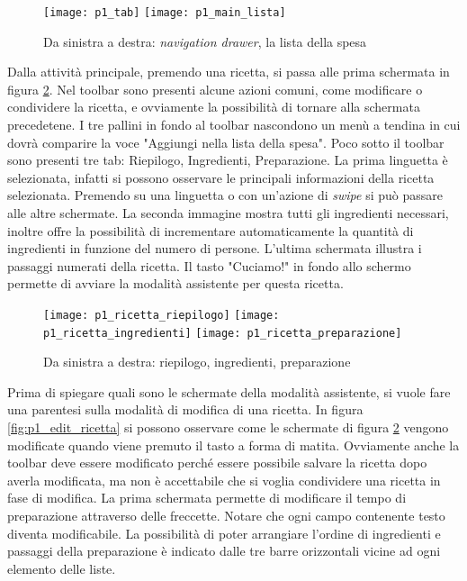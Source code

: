 \begin{figure}[ht]
  \begin{center}
    \texttt{[image: p1\_tab]}
    \texttt{[image: p1\_main\_lista]}
    \caption{Da sinistra a destra: \textit{navigation drawer}, la lista della spesa}
    \label{fig:p1_lista_spesa}
  \end{center}
\end{figure}


\clearpage
Dalla attività principale, premendo una ricetta, si passa alle prima schermata in figura \ref{fig:p1_ricetta}.
Nel toolbar sono presenti alcune azioni comuni, come modificare o condividere la ricetta, e ovviamente la possibilità di tornare alla schermata precedetene.
I tre pallini in fondo al toolbar nascondono un menù a tendina in cui dovrà comparire la voce "Aggiungi nella lista della spesa".
Poco sotto il toolbar sono presenti tre tab: Riepilogo, Ingredienti, Preparazione.
La prima linguetta è selezionata, infatti si possono osservare le principali informazioni della ricetta selezionata.
Premendo su una linguetta o con un'azione di \textit{swipe} si può passare alle altre schermate.
La seconda immagine mostra tutti gli ingredienti necessari, inoltre offre la possibilità di incrementare automaticamente la quantità di ingredienti in funzione del numero di persone.
L'ultima schermata illustra i passaggi numerati della ricetta.
Il tasto "Cuciamo!" in fondo allo schermo permette di avviare la modalità assistente per questa ricetta.

\begin{figure}[ht]
  \begin{center}
    \texttt{[image: p1\_ricetta\_riepilogo]}
    \texttt{[image: p1\_ricetta\_ingredienti]}
    \texttt{[image: p1\_ricetta\_preparazione]}
    \caption{Da sinistra a destra: riepilogo, ingredienti, preparazione}
    \label{fig:p1_ricetta}
  \end{center}
\end{figure}

Prima di spiegare quali sono le schermate della modalità assistente, si vuole fare una parentesi sulla modalità di modifica di una ricetta.
In figura \ref{fig:p1_edit_ricetta} si possono osservare come le schermate di figura \ref{fig:p1_ricetta} vengono modificate quando viene premuto il tasto a forma di matita.
Ovviamente anche la toolbar deve essere modificato perché essere possibile salvare la ricetta dopo averla modificata, ma non è accettabile che si voglia condividere una ricetta in fase di modifica.
La prima schermata permette di modificare il tempo di preparazione attraverso delle freccette.
Notare che ogni campo contenente testo diventa modificabile.
La possibilità di poter arrangiare l'ordine di ingredienti e passaggi della preparazione è indicato dalle tre barre orizzontali vicine ad ogni elemento delle liste.

